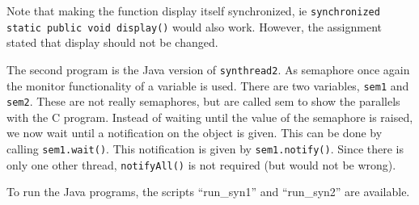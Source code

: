 \documentclass[a4paper]{article}
\begin{document}
Note that making the function display itself synchronized, ie \texttt{synchronized 
static public void display()} would also work. However, the assignment stated that display
should not be changed.

The second program is the Java version of \texttt{synthread2}. As semaphore once again the
monitor functionality of a variable is used. There are two variables, \texttt{sem1} and
\texttt{sem2}. These are not really semaphores, but are called sem to show the parallels 
with the C program. Instead of waiting until the value of the semaphore is raised, we now
wait until a notification on the object is given. This can be done by calling 
\texttt{sem1.wait()}. This notification is given by \texttt{sem1.notify()}. Since there is
only one other thread, \texttt{notifyAll()} is not required (but would not be wrong).

To run the Java programs, the scripts ``run\_syn1'' and ``run\_syn2'' are available.
\end{document}
